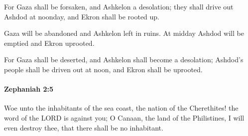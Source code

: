 			\begin{versebox}
					\item[BHS] 
					\item[LXX] 
					\item[ASV] For Gaza shall be forsaken, and Ashkelon a desolation; they shall drive out Ashdod at noonday, and Ekron shall be rooted up.
					\item[NIV] Gaza will be abandoned and Ashkelon left in ruins. At midday Ashdod will be emptied and Ekron uprooted.
					\item[NRSV] For Gaza shall be deserted, and Ashkelon shall become a desolation; Ashdod’s people shall be driven out at noon, and Ekron shall be uprooted.
			\end{versebox}

		\paragraph{Zephaniah 2:5} %
			\label{ZEPHANIAH-2-5}

			Woe unto the inhabitants of the sea coast, the nation of the Cherethites! the word of the LORD is against you; O Canaan, the land of the Philistines, I will even destroy thee, that there shall be no inhabitant.

